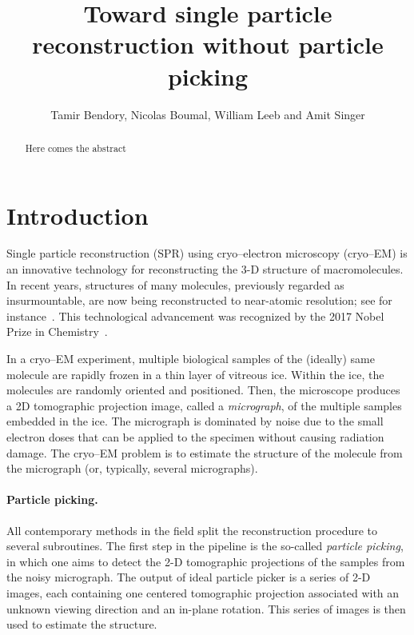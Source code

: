 \documentclass[english,11pt]{article}
\numberwithin{equation}{section}
\theoremstyle{plain}
\theoremstyle{definition}
\theoremstyle{remark}
\theoremstyle{plain}
\theoremstyle{remark}
\theoremstyle{plain}
\theoremstyle{plain}
\begin{document}
\title{Toward single particle reconstruction without particle picking}


\author{Tamir Bendory, Nicolas Boumal, William Leeb and Amit Singer}
\maketitle

\begin{abstract}
	Here comes the abstract
\end{abstract}

\section{Introduction}

Single particle reconstruction (SPR) using cryo--electron microscopy (cryo--EM) is an innovative technology for reconstructing the 3-D structure of macromolecules. In recent years, structures
of many molecules, previously regarded as insurmountable, are now being reconstructed to near-atomic resolution; see for instance~\cite{kuhlbrandt2014resolution,bartesaghi20152,smith2014beyond}. This technological advancement was recognized by the 2017 Nobel Prize in Chemistry~\cite{nobel}. 

In a cryo--EM experiment, multiple biological samples of the (ideally) same molecule are rapidly frozen in a thin layer of vitreous ice. Within the ice, the molecules are randomly oriented and positioned. Then, the microscope produces a 2D tomographic projection image, called a \emph{micrograph}, of the multiple samples embedded in the ice. The micrograph is dominated by noise due to the small electron doses that
can be applied to the specimen without causing radiation damage.
The cryo--EM problem is to estimate the structure of the molecule from the micrograph (or, typically, several micrographs). 

\paragraph{Particle picking.}
All contemporary methods in the field split the reconstruction procedure to several subroutines. 
The first step in the pipeline is the so-called \emph{particle picking}, in which one aims to detect the 2-D tomographic projections of the samples from the noisy micrograph. The output of ideal particle picker is a series of 2-D images, each containing one centered tomographic projection associated with an unknown viewing direction and an in-plane rotation. This series of images 
is then used to estimate the structure.
\end{document}
